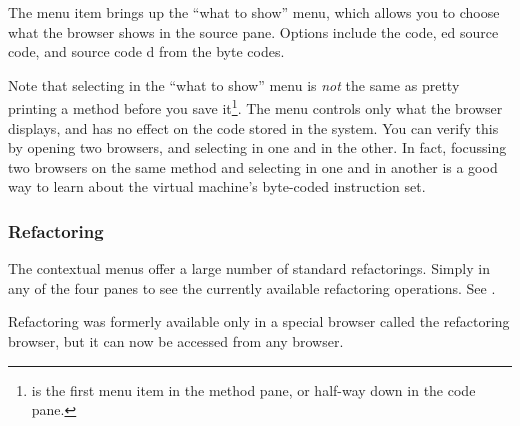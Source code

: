 \documentclass[a4paper,10pt,twoside]{book}
\begin{document}
The  menu item brings up the ``what to show'' menu, which allows you to choose what the browser shows in the source pane.  Options include the  code, ed source code,  and source code d from the byte codes.

Note that selecting  in the ``what to show'' menu is \emph{not} the same as pretty printing a method before you save it\footnote{ is the first menu item in the method pane, or half-way down in the code pane.}.  
The menu controls only what the browser displays, and has no effect on the code stored in the system.  
You can verify this  by opening two browsers, and selecting  in one and  in the other.   
In fact, focussing two browsers on the same method and selecting  in one and  in another is a good way to learn about the \pharo virtual machine's byte-coded instruction set.

\subsubsection{Refactoring}

The contextual menus offer a large number of standard refactorings.
Simply \actclick in any of the four panes to see the currently available refactoring operations.
See .

Refactoring was formerly available only in a special browser called the refactoring browser, but it can now be accessed from any browser.
\end{document}
